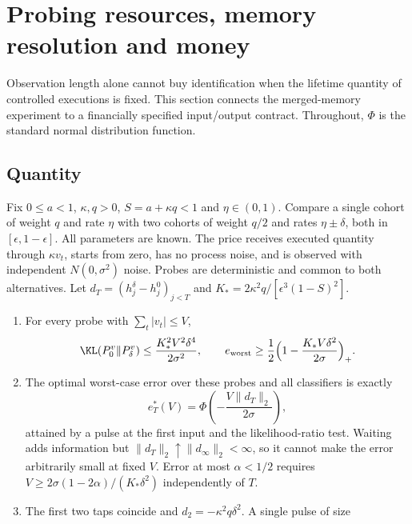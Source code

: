 \section{Probing resources, memory resolution and money}\label{sec:resources}

Observation length alone cannot buy identification when the lifetime quantity of controlled executions is fixed. This section connects the merged-memory experiment to a financially specified input/output contract. Throughout, $\Phi$ is the standard normal distribution function.

\subsection{Quantity}

\begin{theorem}\label{thm:quantity}
Fix $0\le a<1$, $\kappa,q>0$, $S=a+\kappa q<1$ and $\eta\in(0,1)$. Compare a single cohort of weight $q$ and rate $\eta$ with two cohorts of weight $q/2$ and rates $\eta\pm\delta$, both in $[\epsilon,1-\epsilon]$. All parameters are known. The price receives executed quantity through $\kappa v_t$, starts from zero, has no process noise, and is observed with independent $N(0,\sigma^2)$ noise. Probes are deterministic and common to both alternatives. Let $d_T=(h^\delta_j-h^0_j)_{j<T}$ and $K_*=2\kappa^2q/[\epsilon^3(1-S)^2]$.
\begin{enumerate}[label=(\roman*)]
\item For every probe with $\sum_t|v_t|\le V$,
\begin{equation}\label{eq:klV}
\KL(P_0^v\|P_\delta^v)\le\frac{K_*^2V^2\delta^4}{2\sigma^2},\qquad e_{\rm worst}\ge\frac12\Bigl(1-\frac{K_*V\delta^2}{2\sigma}\Bigr)_+ .
\end{equation}
\item The optimal worst-case error over these probes and all classifiers is exactly
\begin{equation}\label{eq:exacterr}
e^*_T(V)=\Phi\!\left(-\frac{V\|d_T\|_2}{2\sigma}\right),
\end{equation}
attained by a pulse at the first input and the likelihood-ratio test. Waiting adds information but $\|d_T\|_2\uparrow\|d_\infty\|_2<\infty$, so it cannot make the error arbitrarily small at fixed $V$. Error at most $\alpha<1/2$ requires $V\ge2\sigma(1-2\alpha)/(K_*\delta^2)$ independently of $T$.
\item The first two taps coincide and $d_2=-\kappa^2q\delta^2$. A single pulse of size

\end{enumerate}
\end{theorem}
